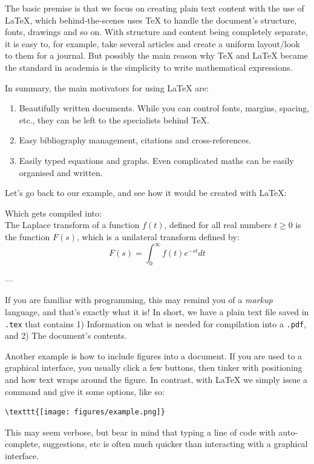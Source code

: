         The basic premise is that we focus on creating plain text content with the use of \LaTeX, which behind-the-scenes uses \TeX{} to handle the document's structure, fonts, drawings and so on.
        With structure and content being completely separate, it is easy to, for example, take several articles and create a uniform layout/look to them for a journal.
        But possibly the main reason why \TeX{} and \LaTeX{} became the standard in academia is the simplicity to write mathematical expressions.

        In summary, the main motivators for using \LaTeX{} are:
        \begin{enumerate}
            \item Beautifully written documents. While you can control fonts, margins, spacing, etc., they can be left to the specialists behind \TeX.  
            \item Easy bibliography management, citations and cross-references.
            \item Easily typed equations and graphs. Even complicated maths can be easily organised and written.
        \end{enumerate}

        Let's go back to our example, and see how it would be created with \LaTeX:
        
        Which gets compiled into:\\
        The Laplace transform of a function $f(t)$, defined for all real numbers $t \geq 0$ is the function $F(s)$, which is a unilateral transform defined by:
        \begin{equation*}
            F(s) = \int_0^\infty f(t)e^{-st} dt
        \end{equation*}

        ---
        
        If you are familiar with programming, this may remind you of a \emph{markup} language, and that's exactly what it is!
        In short, we have a plain text file saved in \texttt{.tex} that contains 1) Information on what is needed for compilation into a \texttt{.pdf}, and 2) The document's contents.

        Another example is how to include figures into a document.
        If you are used to a graphical interface, you usually click a few buttons, then tinker with positioning and how text wraps around the figure.
        In contrast, with \LaTeX{} we simply issue a command and give it some options, like so:
        \begin{lstlisting}
\texttt{[image: figures/example.png]}
        \end{lstlisting}
        This may seem verbose, but bear in mind that typing a line of code with auto-complete, suggestions, etc is often much quicker than interacting with a graphical interface.


